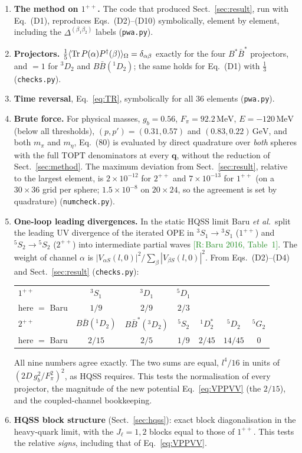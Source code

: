\documentclass[11pt,a4paper]{article}
\newcommand{\tagR}[1]{\textcolor{ForestGreen}{\textsf{\small[R:\,#1]}}}
\newcommand{\tagN}{\textcolor{red!70!black}{\textsf{\small[N]}}}
\newcommand{\BB}{B\bar B}
\newcommand{\BBst}{B\bar B^*}
\newcommand{\BstBst}{B^*\bar B^*}
\newcommand{\GeV}{\,\mathrm{GeV}}
\newcommand{\MeV}{\,\mathrm{MeV}}
\newcommand{\D}[2]{\Delta^{(#1)}_{#2}}
\newcommand{\vq}{\bm q}
\begin{document}
\begin{numbox}[What was checked, and how \tagN]
\begin{enumerate}
\item \textbf{The method on $1^{++}$.} The code that produced Sect.~\ref{sec:result}, run with Eq.~(D1), reproduces Eqs.~(D2)--(D10) symbolically, element by element, including the $\D{\beta_1\beta_2}{}$ labels (\texttt{pwa.py}).
\item \textbf{Projectors.} $\frac15\langle{\rm Tr}\,P(\alpha)P^\dagger(\beta)\rangle_\Omega=\delta_{\alpha\beta}$ exactly for the four $\BstBst$ projectors, and $=1$ for $^3D_2$ and $\BB(^1D_2)$; the same holds for Eq.~(D1) with $\frac13$ (\texttt{checks.py}).
\item \textbf{Time reversal}, Eq.~\eqref{eq:TR}, symbolically for all 36 elements (\texttt{pwa.py}).
\item \textbf{Brute force.} For physical masses, $g_b=0.56$, $F_\pi=92.2\MeV$, $E=-120\MeV$ (below all thresholds), $(p,p')=(0.31,0.57)$ and $(0.83,0.22)\GeV$, and both $m_\pi$ and $m_\eta$, Eq.~(80) is evaluated by direct quadrature over \emph{both} spheres with the full TOPT denominators at every $\vq$, without the reduction of Sect.~\ref{sec:method}. The maximum deviation from Sect.~\ref{sec:result}, relative to the largest element, is $2\times10^{-12}$ for $2^{++}$ and $7\times10^{-13}$ for $1^{++}$ (on a $30\times36$ grid per sphere; $1.5\times10^{-8}$ on $20\times24$, so the agreement is set by quadrature) (\texttt{numcheck.py}).
\item \textbf{One-loop leading divergences.} In the static HQSS limit Baru \emph{et al.}\ split the leading UV divergence of the iterated OPE in $^3S_1\to{}^3S_1$ ($1^{++}$) and $^5S_2\to{}^5S_2$ ($2^{++}$) into intermediate partial waves \tagR{Baru 2016, Table~1}. The weight of channel $\alpha$ is $|V_{\alpha S}(l,0)|^2/\sum_\beta|V_{\beta S}(l,0)|^2$. From Eqs.~(D2)--(D4) and Sect.~\ref{sec:result} (\texttt{checks.py}):
\begin{center}
\small
\begin{tabular}{lcccccc}
\toprule
$1^{++}$ & $^3S_1$ & $^3D_1$ & $^5D_1$ &&&\\
here $=$ Baru & $1/9$ & $2/9$ & $2/3$ &&&\\
\midrule
$2^{++}$ & $\BB(^1D_2)$ & $\BBst(^3D_2)$ & $^5S_2$ & $^1D_2^*$ & $^5D_2$ & $^5G_2$\\
here $=$ Baru & $2/15$ & $2/5$ & $1/9$ & $2/45$ & $14/45$ & $0$\\
\bottomrule
\end{tabular}
\end{center}
All nine numbers agree exactly. The two sums are equal, $l^4/16$ in units of $(2D\,g_b^2/F_\pi^2)^2$, as HQSS requires. This tests the normalisation of every projector, the magnitude of the new potential Eq.~\eqref{eq:VPPVV} (the $2/15$), and the coupled-channel bookkeeping.
\item \textbf{HQSS block structure} (Sect.~\ref{sec:hqss}): exact block diagonalisation in the heavy-quark limit, with the $J_\ell=1,2$ blocks equal to those of $1^{++}$. This tests the relative \emph{signs}, including that of Eq.~\eqref{eq:VPPVV}.
\end{enumerate}
\end{numbox}
\end{document}
